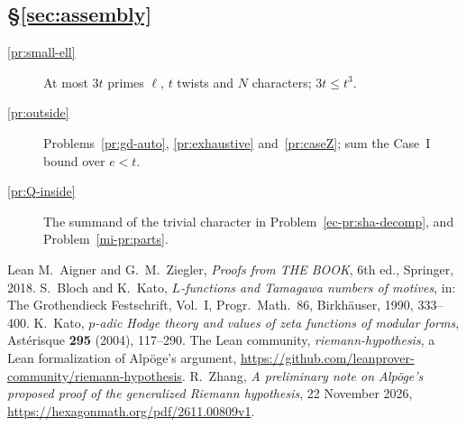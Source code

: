 \documentclass[reqno]{amsart}
\theoremstyle{definition}
\theoremstyle{plain}
\theoremstyle{remark}
\begin{document}
\subsection*{\S\ref{sec:assembly}}
\begin{description}
\item[\ref{pr:small-ell}] At most \(3t\) primes \(\ell\), \(t\) twists and \(N\) characters; \(3t\le t^3\).
\item[\ref{pr:outside}] Problems~\ref{pr:gd-auto}, \ref{pr:exhaustive} and~\ref{pr:caseZ}; sum the Case~I bound over \(e<t\).
\item[\ref{pr:Q-inside}] The summand of the trivial character in Problem~\ref{ec-pr:sha-decomp}, and Problem~\ref{mi-pr:parts}.
\end{description}

\begin{thebibliography}{Lean}
 M.~Aigner and G.~M.~Ziegler, \emph{Proofs from THE BOOK}, 6th ed., Springer, 2018.
 S.~Bloch and K.~Kato, \emph{\(L\)-functions and Tamagawa numbers of motives}, in: The Grothendieck Festschrift, Vol.~I, Progr.\ Math.\ 86, Birkh\"auser, 1990, 333--400.
 K.~Kato, \emph{\(p\)-adic Hodge theory and values of zeta functions of modular forms}, Ast\'erisque \textbf{295} (2004), 117--290.
 The Lean community, \emph{riemann-hypothesis}, a Lean formalization of Alp\"oge's argument, \url{https://github.com/leanprover-community/riemann-hypothesis}.
 R.~Zhang, \emph{A preliminary note on Alp\"oge's proposed proof of the generalized Riemann hypothesis}, 22 November 2026, \url{https://hexagonmath.org/pdf/2611.00809v1}.
\end{thebibliography}
\end{document}

